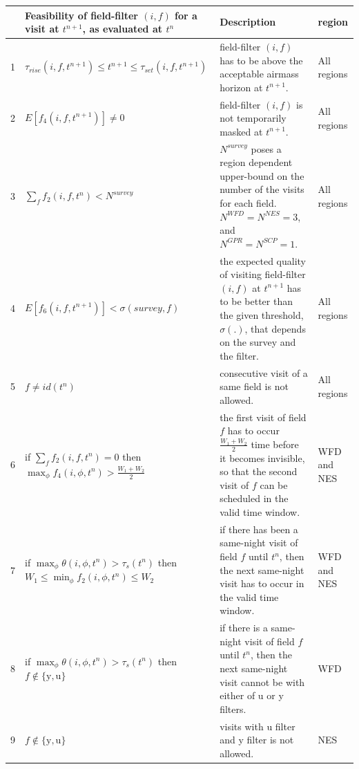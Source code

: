 \documentclass[12pt]{aastex62}
\theoremstyle{definition}
\begin{document}
\begin{table}[h!]
\begin{tabularx}{\textwidth}{| l | X | X | l |}
\hline
& Feasibility of field-filter $(i,f)$ for a visit at $t^{n+1}$, as evaluated at $t^n$& Description & region\\ \hline \hline

1&$ \tau_{rise}(i,f,t^{n+1}) \leq t^{n+1} \leq \tau_{set}(i,f,t^{n+1}) $ & field-filter $(i,f)$ has to be above the acceptable airmass horizon at $t^{n+1}.$ & All regions\\ \hline

2&$ E[f_4(i,f,t^{n+1})] \neq 0 $ & field-filter $(i,f)$ is not temporarily masked at $t^{n+1}$. & All regions\\ \hline

3 & $\sum_{f}f_2(i,f,t^n) < N^{\textit{survey}}$ & $N^{\textit{survey}}$ poses a region dependent upper-bound on the number of the visits for each field. $N^{WFD}= N^{NES} = 3$, and $N^{GPR}= N^{SCP} = 1.$ & All regions\\ \hline

4 & $E[f_6(i,f,t^{n+1})] < \sigma({\textit{survey},f})$ & the expected quality of visiting field-filter $(i,f)$ at $t^{n+1}$ has to be better than the given threshold, $\sigma(.)$, that depends on the survey and the filter. & All regions\\ \hline

5&$f \neq id(t^n)$ & consecutive visit of a same field is not allowed. & All regions\\ \hline

6& if $\sum_{f}f_2(i,f,t^n) = 0$ then \newline $\max_\phi f_4(i,\phi,t^n) > \frac{W_1+W_2}{2}$ & the first visit of field $f$ has to occur $\frac{W_1+W_2}{2}$ time before it becomes invisible, so that the second visit of $f$ can be scheduled in the valid time window. & WFD and NES\\ \hline

7& if $\max_{\phi}\theta(i,\phi,t^n) > \tau_s(t^n)$ then \newline $ W_1 \leq \min_{\phi}f_2(i,\phi,t^n) \leq W_2 $& if there has been a same-night visit of field $f$ until $t^n$, then the next same-night visit has to occur in the valid time window. & WFD and NES\\ \hline

8&if \newline $\max_{\phi}\theta(i,\phi,t^n) > \tau_s(t^n)$ then \newline $f \notin \{\text{y},\text{u}\}$& if there is a same-night visit of field $f$ until $t^n$, then the next same-night visit cannot be with either of u or y filters. & WFD\\ \hline

9& $f \notin \{\text{y},\text{u}\}$ & visits with u filter and y filter is not allowed. & NES\\ \hline

\end{tabularx}
\end{table}\label{tab_feasibility}
\end{document}
